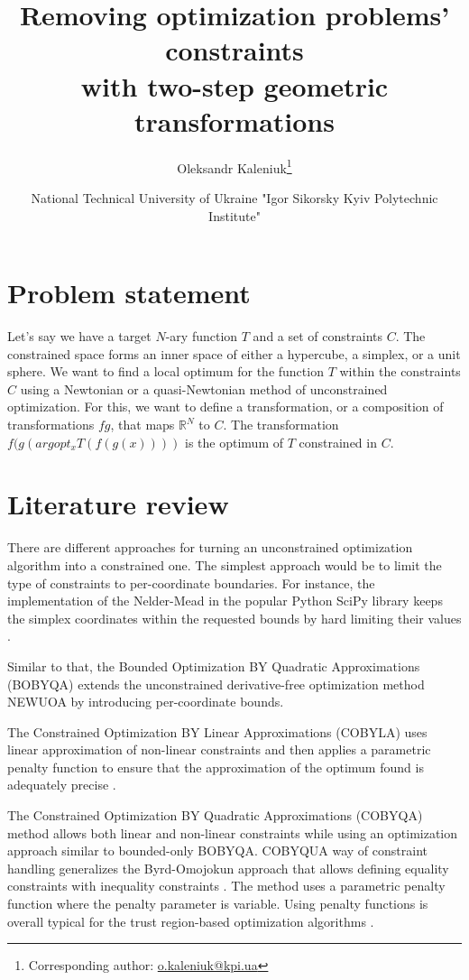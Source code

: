 \documentclass[
	a4paper, %
	10pt, %
	unnumberedsections, %
	twoside, %
]{LTJournalArticle}
\title{Removing optimization problems' constraints\\ with two-step geometric transformations}
\author{%
	Oleksandr Kaleniuk\thanks{Corresponding author: \href{mailto:o.kaleniuk@kpi.ua}{o.kaleniuk@kpi.ua}}
}
\date{\footnotesize National Technical University of Ukraine "Igor Sikorsky Kyiv Polytechnic Institute"}
\begin{document}
\maketitle %

\section{Problem statement}

Let's say we have a target $N$-ary function $T$ and a set of constraints $C$. The constrained space forms an inner space of either a hypercube, a simplex, or a unit sphere. We want to find a local optimum for the function $T$ within the constraints $C$ using a Newtonian or a quasi-Newtonian method of unconstrained optimization. For this, we want to define a transformation, or a composition of transformations $f g$, that maps $\mathbb{R}^N$ to $C$. The transformation $f(g(argopt_x T(f(g(x))))$ is the optimum of $T$ constrained in $C$.

\section{Literature review}

There are different approaches for turning an unconstrained optimization algorithm into a constrained one. The simplest approach would be to limit the type of constraints to per-coordinate boundaries. For instance, the implementation of the Nelder-Mead in the popular Python SciPy library keeps the simplex coordinates within the requested bounds by hard limiting their values \cite{Gao:2012}. 

Similar to that, the Bounded Optimization BY Quadratic Approximations (BOBYQA) \cite{Powell:2009} extends the unconstrained derivative-free optimization method NEWUOA \cite{Powell:2006} by introducing per-coordinate bounds.

The Constrained Optimization BY Linear Approximations (COBYLA) uses linear approximation of non-linear constraints and then applies a parametric penalty function to ensure that the approximation of the optimum found is adequately precise \cite{Powell:1994}.

The Constrained Optimization BY Quadratic Approximations (COBYQA) method allows both linear and non-linear constraints while using an optimization approach similar to bounded-only BOBYQA. COBYQUA way of constraint handling generalizes the Byrd-Omojokun approach \cite{Byrd:1987, Omojokun:1989} that allows defining equality constraints with inequality constraints \cite{Ragonneau:2022}. The method uses a parametric penalty function where the penalty parameter is variable. Using penalty functions is overall typical for the trust region-based optimization algorithms \cite{Conn:2000}. 
\end{document}
